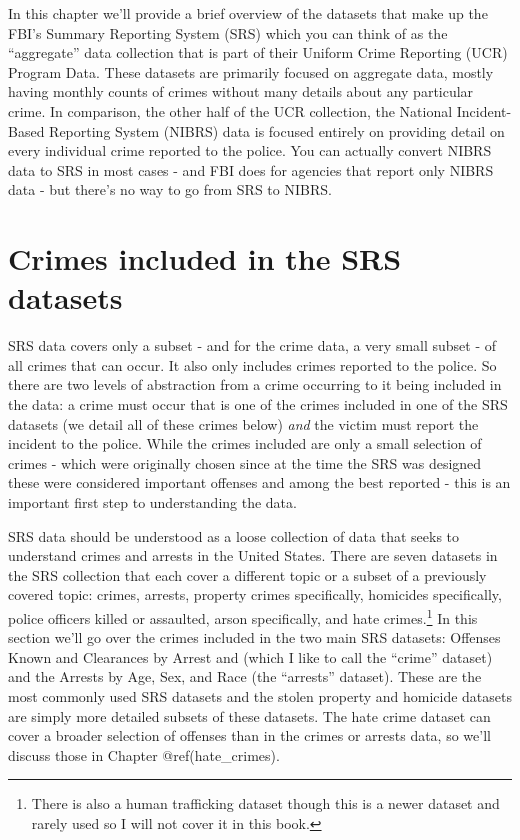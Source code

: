 \documentclass[
]{krantz}
\begin{document}
In this chapter we'll provide a brief overview of the
datasets that make up the FBI's Summary Reporting System
(SRS) which you can think of as the ``aggregate'' data
collection that is part of their Uniform Crime Reporting
(UCR) Program Data. These datasets are primarily focused on
aggregate data, mostly having monthly counts of crimes
without many details about any particular crime. In
comparison, the other half of the UCR collection, the
National Incident-Based Reporting System (NIBRS) data is
focused entirely on providing detail on every individual
crime reported to the police. You can actually convert NIBRS
data to SRS in most cases - and FBI does for agencies that
report only NIBRS data - but there's no way to go from SRS
to NIBRS.

\section{Crimes included in the SRS
datasets}\label{crimes-included-in-the-srs-datasets}

SRS data covers only a subset - and for the crime data, a
very small subset - of all crimes that can occur. It also
only includes crimes reported to the police. So there are
two levels of abstraction from a crime occurring to it being
included in the data: a crime must occur that is one of the
crimes included in one of the SRS datasets (we detail all of
these crimes below) \emph{and} the victim must report the
incident to the police. While the crimes included are only a
small selection of crimes - which were originally chosen
since at the time the SRS was designed these were considered
important offenses and among the best reported - this is an
important first step to understanding the data.

SRS data should be understood as a loose collection of data
that seeks to understand crimes and arrests in the United
States. There are seven datasets in the SRS collection that
each cover a different topic or a subset of a previously
covered topic: crimes, arrests, property crimes
specifically, homicides specifically, police officers killed
or assaulted, arson specifically, and hate
crimes.\footnote{There is also a human trafficking dataset
  though this is a newer dataset and rarely used so I will
  not cover it in this book.} In this section we'll go over
the crimes included in the two main SRS datasets: Offenses
Known and Clearances by Arrest and (which I like to call the
``crime'' dataset) and the Arrests by Age, Sex, and Race
(the ``arrests'' dataset). These are the most commonly used
SRS datasets and the stolen property and homicide datasets
are simply more detailed subsets of these datasets. The hate
crime dataset can cover a broader selection of offenses than
in the crimes or arrests data, so we'll discuss those in
Chapter @ref(hate\_crimes).
\end{document}
